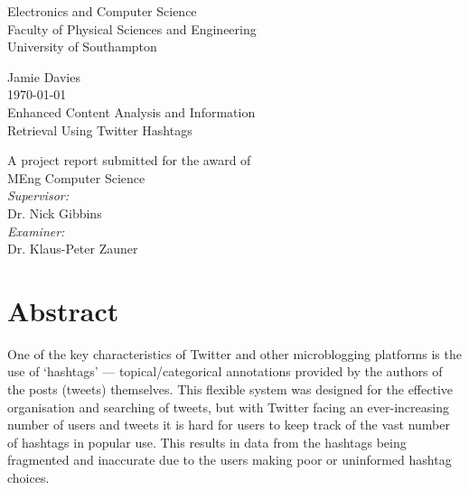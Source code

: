 \documentclass[12pt,a4paper]{article}
\begin{document}
\listoftodos[Todo]
\pagebreak

\begin{titlepage}
\center
\vspace*{3cm}

{\Large
    Electronics and Computer Science\\
    Faculty of Physical Sciences and Engineering\\
    University of Southampton\\[1cm]
}

Jamie Davies\\
\today\\[1cm]

{\large
    Enhanced Content Analysis and Information\\
    Retrieval Using Twitter Hashtags\\[1cm]
}

A project report submitted for the award of\\
MEng Computer Science\\[1cm]

\emph{Supervisor:}\\
Dr. Nick Gibbins\\[0.5cm]

\emph{Examiner:}\\
Dr. Klaus-Peter Zauner\\


\vfill
\end{titlepage}

\section*{Abstract}
One of the key characteristics of Twitter and other microblogging platforms is the use of `hashtags' --- topical/categorical annotations provided by the authors of the posts (tweets) themselves. This flexible system was designed for the effective organisation and searching of tweets, but with Twitter facing an ever-increasing number of users and tweets it is hard for users to keep track of the vast number of hashtags in popular use. This results in data from the hashtags being fragmented and inaccurate due to the users making poor or uninformed hashtag choices.
\end{document}
